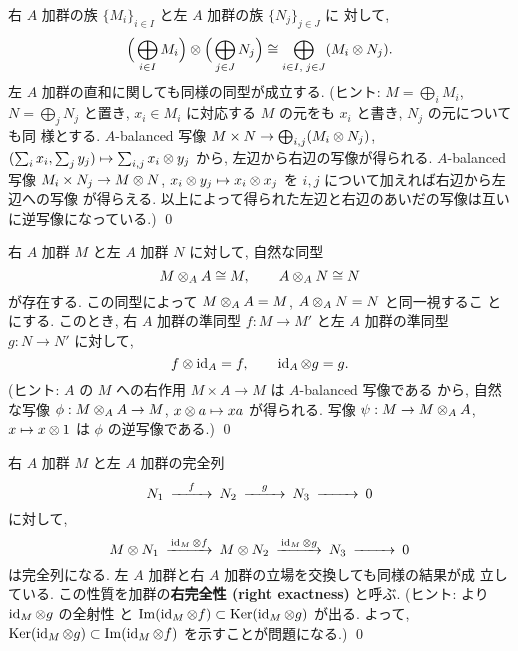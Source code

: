 \documentclass[12pt,twoside]{jarticle}
\begin{document}
\begin{question}[テンソル積と直和の可換性]
\label{q:tensor-sum}
  右 $A$ 加群の族 $\{M_i\}_{i\in I}$ と左 $A$ 加群の族 $\{N_j\}_{j\in J}$ に
  対して, 
  \begin{equation*}
    \Big( \bigoplus_{i\in I} M_i \Big)\otimes\Big( \bigoplus_{j\in J} N_j \Big)
    \cong \bigoplus_{i\in I,\;j\in J} (M_i \otimes N_j).
  \end{equation*}
  左 $A$ 加群の直和に関しても同様の同型が成立する. 
  (ヒント: $M=\bigoplus_i M_i$, $N=\bigoplus_j N_j$ と置き,
  $x_i\in M_i$ に対応する $M$ の元をも $x_i$ と書き, $N_j$ の元についても同
  様とする. 
  $A$-balanced 写像 $M\times N\to\bigoplus_{i,j}(M_i\otimes N_j)$,
  $(\sum_i x_i, \sum_j y_j)\mapsto \sum_{i,j} x_i\otimes y_j$ から,
  左辺から右辺の写像が得られる. 
  $A$-balanced 写像 $M_i\times N_j\to M\otimes N$, 
  $x_i\otimes y_j\mapsto x_i\otimes x_j$ を $i,j$ について加えれば右辺から左辺への写像
  が得らえる. 
  以上によって得られた左辺と右辺のあいだの写像は互いに逆写像になっている.) 
  \qed
\end{question}

\begin{question}
\label{q:tensor-A}
  右 $A$ 加群 $M$ と左 $A$ 加群 $N$ に対して, 自然な同型
  \begin{equation*}
    M\otimes_A A \cong M, \qquad A\otimes_A N \cong N
  \end{equation*}
  が存在する.  この同型によって $M\otimes_A A = M$, $A\otimes_A N = N$ と同一視するこ
  とにする. このとき, 右 $A$ 加群の準同型 $f:M\to M'$ 
  と左 $A$ 加群の準同型 $g:N\to N'$ に対して,
  \begin{equation*}
    f\otimes\mathop{\mathrm{id}}\nolimits_A = f, \qquad \mathop{\mathrm{id}}\nolimits_A\otimes g = g.
  \end{equation*}
  (ヒント: $A$ の $M$ への右作用 $M\times A\to M$ は $A$-balanced 写像である
  から, 自然な写像 $\phi:M\otimes_A A\to M$, $x\otimes a\mapsto xa$ が得られる.
  写像 $\psi:M\to M\otimes_A A$, $x\mapsto x\otimes 1$ は $\phi$ の逆写像である.)
  \qed
\end{question}

\begin{question}[テンソル積の右完全性]
\label{q:right-exact-2}
  右 $A$ 加群 $M$ と左 $A$ 加群の完全列
  \begin{equation*}
    \begin{CD}
      N_1 @>{f}>> N_2 @>{g}>> N_3 @>>> 0
    \end{CD}
  \end{equation*}
  に対して, 
  \begin{equation*}
    \begin{CD}
      M\o N_1 @>{\id_M\o f}>> M\o N_2 @>{\id_M\o g}>> N_3 @>>> 0
    \end{CD}
  \end{equation*}
  は完全列になる.  左 $A$ 加群と右 $A$ 加群の立場を交換しても同様の結果が成
  立している.  この性質を加群の{\bf 右完全性 (right exactness)} と呼ぶ.
  (ヒント:  より $\mathop{\mathrm{id}}\nolimits_M\otimes g$ の全射性
  と $\mathop{\mathrm{Im}}\nolimits(\mathop{\mathrm{id}}\nolimits_M\otimes f)\subset\mathop{\mathrm{Ker}}\nolimits(\mathop{\mathrm{id}}\nolimits_M\otimes g)$ が出る.
  よって, $\mathop{\mathrm{Ker}}\nolimits(\mathop{\mathrm{id}}\nolimits_M\otimes g)\subset\mathop{\mathrm{Im}}\nolimits(\mathop{\mathrm{id}}\nolimits_M\otimes f)$ を示すことが問題になる.)
  \qed
\end{question}
\end{document}
